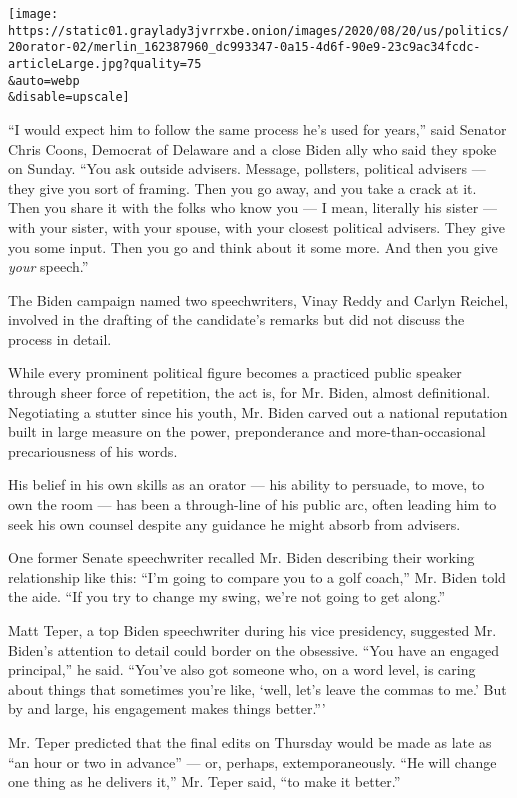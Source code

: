\texttt{[image: https://static01.graylady3jvrrxbe.onion/images/2020/08/20/us/politics/20orator-02/merlin\_162387960\_dc993347-0a15-4d6f-90e9-23c9ac34fcdc-articleLarge.jpg?quality=75\\\&auto=webp\\\&disable=upscale]}

``I would expect him to follow the same process he's used for years,''
said Senator Chris Coons, Democrat of Delaware and a close Biden ally
who said they spoke on Sunday. ``You ask outside advisers. Message,
pollsters, political advisers --- they give you sort of framing. Then
you go away, and you take a crack at it. Then you share it with the
folks who know you --- I mean, literally his sister --- with your
sister, with your spouse, with your closest political advisers. They
give you some input. Then you go and think about it some more. And then
you give \emph{your} speech.''

The Biden campaign named two speechwriters, Vinay Reddy and Carlyn
Reichel, involved in the drafting of the candidate's remarks but did not
discuss the process in detail.

While every prominent political figure becomes a practiced public
speaker through sheer force of repetition, the act is, for Mr. Biden,
almost definitional. Negotiating a stutter since his youth, Mr. Biden
carved out a national reputation built in large measure on the power,
preponderance and more-than-occasional precariousness of his words.

His belief in his own skills as an orator --- his ability to persuade,
to move, to own the room --- has been a through-line of his public arc,
often leading him to seek his own counsel despite any guidance he might
absorb from advisers.

One former Senate speechwriter recalled Mr. Biden describing their
working relationship like this: ``I'm going to compare you to a golf
coach,'' Mr. Biden told the aide. ``If you try to change my swing, we're
not going to get along.''

Matt Teper, a top Biden speechwriter during his vice presidency,
suggested Mr. Biden's attention to detail could border on the obsessive.
``You have an engaged principal,'' he said. ``You've also got someone
who, on a word level, is caring about things that sometimes you're like,
`well, let's leave the commas to me.' But by and large, his engagement
makes things better.'''

Mr. Teper predicted that the final edits on Thursday would be made as
late as ``an hour or two in advance'' --- or, perhaps, extemporaneously.
``He will change one thing as he delivers it,'' Mr. Teper said, ``to
make it better.''

